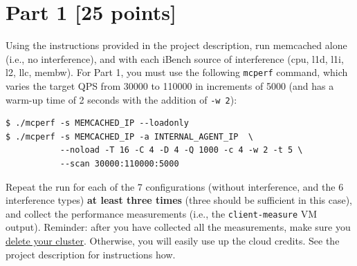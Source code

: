 \section*{Part 1 [25 points]}

Using the instructions provided in the project description, run memcached alone (i.e., no interference), and with each iBench source of interference (cpu, l1d, l1i, l2, llc, membw). For Part 1, you must use the following \texttt{mcperf} command, which varies the target QPS from 30000 to 110000 in increments of 5000 (and has a warm-up time of 2 seconds with the addition of \texttt{-w 2}):

\begin{verbatim}
$ ./mcperf -s MEMCACHED_IP --loadonly
$ ./mcperf -s MEMCACHED_IP -a INTERNAL_AGENT_IP  \
           --noload -T 16 -C 4 -D 4 -Q 1000 -c 4 -w 2 -t 5 \ 
           --scan 30000:110000:5000
\end{verbatim}

\noindent Repeat the run for each of the 7 configurations (without interference, and the 6 interference types) \textbf{at least three times} (three should be sufficient in this case), and collect the performance measurements (i.e., the \texttt{client-measure} VM output). Reminder: after you have collected all the measurements, make sure you \underline{delete your cluster}. Otherwise, you will easily use up the cloud credits. See the project description for instructions how.


